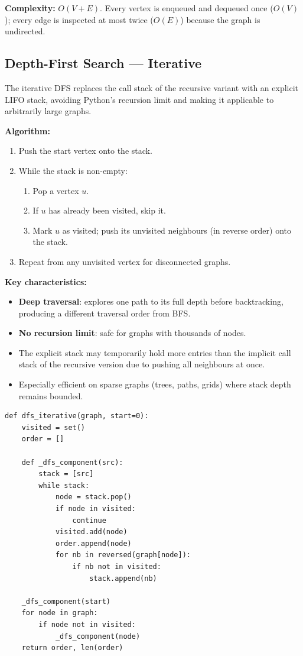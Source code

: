 \textbf{Complexity:} $O(V + E)$. Every vertex is enqueued and dequeued once ($O(V)$); every edge is inspected at most twice ($O(E)$) because the graph is undirected.


\subsection{Depth-First Search — Iterative}

The iterative DFS replaces the call stack of the recursive variant with an explicit LIFO stack, avoiding Python's recursion limit and making it applicable to arbitrarily large graphs.

\textbf{Algorithm:}
\begin{enumerate}
    \item Push the start vertex onto the stack.
    \item While the stack is non-empty:
    \begin{enumerate}
        \item Pop a vertex $u$.
        \item If $u$ has already been visited, skip it.
        \item Mark $u$ as visited; push its unvisited neighbours (in reverse order) onto the stack.
    \end{enumerate}
    \item Repeat from any unvisited vertex for disconnected graphs.
\end{enumerate}

\textbf{Key characteristics:}
\begin{itemize}
    \item \textbf{Deep traversal}: explores one path to its full depth before backtracking, producing a different traversal order from BFS.
    \item \textbf{No recursion limit}: safe for graphs with thousands of nodes.
    \item The explicit stack may temporarily hold more entries than the implicit call stack of the recursive version due to pushing all neighbours at once.
    \item Especially efficient on sparse graphs (trees, paths, grids) where stack depth remains bounded.
\end{itemize}

\begin{verbatim}
def dfs_iterative(graph, start=0):
    visited = set()
    order = []

    def _dfs_component(src):
        stack = [src]
        while stack:
            node = stack.pop()
            if node in visited:
                continue
            visited.add(node)
            order.append(node)
            for nb in reversed(graph[node]):
                if nb not in visited:
                    stack.append(nb)

    _dfs_component(start)
    for node in graph:
        if node not in visited:
            _dfs_component(node)
    return order, len(order)
\end{verbatim}

